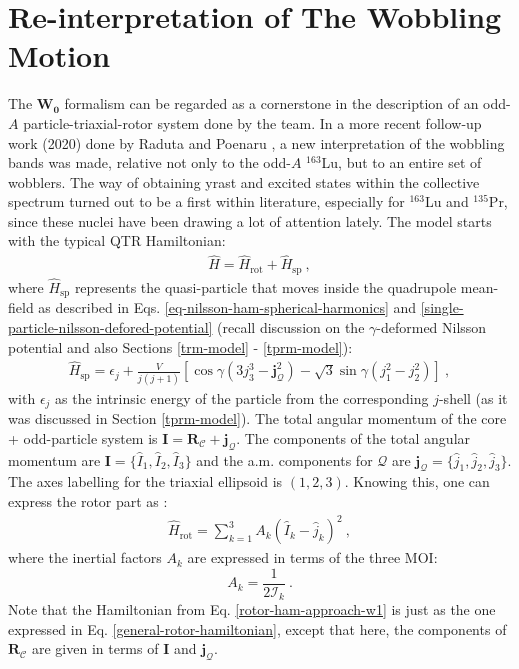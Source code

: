 \section{Re-interpretation of The Wobbling Motion}

The $\mathbf{W_0}$ formalism can be regarded as a cornerstone in the description of an odd-$A$ particle-triaxial-rotor system done by the team. In a more recent follow-up work (2020) done by Raduta and Poenaru \cite{raduta2020approach,raduta2020towards}, a new interpretation of the wobbling bands was made, relative not only to the odd-$A$ $^{163}$Lu, but to an entire set of wobblers. The way of obtaining yrast and excited states within the collective spectrum turned out to be a first within literature, especially for $^{163}$Lu and $^{135}$Pr, since these nuclei have been drawing a lot of attention lately. The model starts with the typical QTR Hamiltonian:
\begin{align}
    \hat{H}=\hat{H}_\text{rot}+\hat{H}_\text{sp}\ ,
    \label{total-ham-approach-w1}
\end{align}
where $\hat{H}_\text{sp}$ represents the quasi-particle that moves inside the quadrupole mean-field as described in Eqs. \ref{eq-nilsson-ham-spherical-harmonics} and \ref{single-particle-nilsson-defored-potential} (recall discussion on the $\gamma$-deformed Nilsson potential and also Sections \ref{trm-model} - \ref{tprm-model}):
\begin{align}
    \hat{H}_\text{sp}=\epsilon_j+\frac{V}{j(j+1)}\left[\cos\gamma\left(3j_3^3-\mathbf{j}_\mathcal{Q}^2\right)-\sqrt{3}\sin\gamma\left(j_1^2-j_2^2\right)\right]\ ,
    \label{single-particle-ham-approach-w1}
\end{align}
with $\epsilon_j$ as the intrinsic energy of the particle from the corresponding $j$-shell (as it was discussed in Section \ref{tprm-model}). The total angular momentum of the core + odd-particle system is $\mathbf{I}=\mathbf{R}_\mathscr{C}+\mathbf{j}_{\mathcal{Q}}$. The components of the total angular momentum are $\mathbf{I}=\{\hat{I}_1,\hat{I}_2,\hat{I}_3\}$ and the a.m. components for $\mathcal{Q}$ are $\mathbf{j}_{\mathcal{Q}}=\{\hat{j}_1,\hat{j}_2,\hat{j}_3\}$. The axes labelling for the triaxial ellipsoid is $(1,2,3)$. Knowing this, one can express the rotor part as \cite{raduta2020approach}:
\begin{align}
    \hat{H}_\text{rot}=\sum_{k=1}^3A_k(\hat{I}_k-\hat{j}_k)^2\ ,
    \label{rotor-ham-approach-w1}
\end{align}
where the inertial factors $A_k$ are expressed in terms of the three MOI:$$A_k=\frac{1}{2\mathcal{I}_k}\ .$$
Note that the Hamiltonian from Eq. \ref{rotor-ham-approach-w1} is just as the one expressed in Eq. \ref{general-rotor-hamiltonian}, except that here, the components of $\mathbf{R}_\mathscr{C}$ are given in terms of $\mathbf{I}$ and $\mathbf{j}_{\mathcal{Q}}$.

